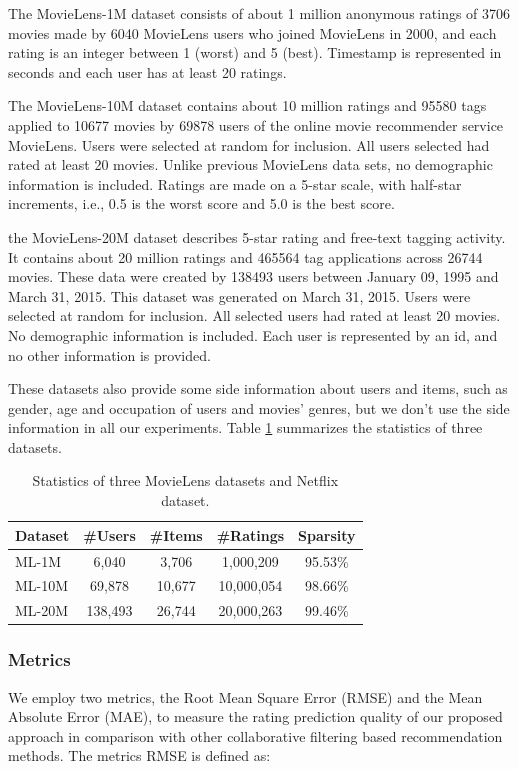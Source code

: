 \documentclass{sig-alternate-05-2015}
\begin{document}
The MovieLens-1M dataset consists of about 1 million anonymous ratings of 3706 movies
made by 6040 MovieLens users who joined MovieLens in 2000,
and each rating is an integer between 1 (worst) and 5 (best).
Timestamp is represented in seconds and each user has at least 20 ratings.

The MovieLens-10M dataset contains about 10 million ratings and 95580 tags
applied to 10677 movies by 69878 users of the online movie recommender service MovieLens.
Users were selected at random for inclusion. All users selected had rated
at least 20 movies. Unlike previous MovieLens data sets, no demographic information is included.
Ratings are made on a 5-star scale, with half-star increments, i.e., 0.5 is the worst score
and 5.0 is the best score.

the MovieLens-20M dataset describes 5-star rating and free-text tagging activity.
It contains about 20 million ratings and 465564 tag applications across 26744 movies.
These data were created by 138493 users between January 09, 1995 and March 31, 2015.
This dataset was generated on March 31, 2015.
Users were selected at random for inclusion. All selected users had rated
at least 20 movies. No demographic information is included.
Each user is represented by an id, and no other information is provided.

These datasets also provide some side information about users and items,
such as gender, age and occupation of users and movies' genres,
but we don't use the side information in all our experiments.
Table \ref{tab:statistics} summarizes the statistics of three datasets.

\begin{table}[htbp]
    \centering
    \caption{Statistics of three MovieLens datasets and Netflix dataset.}
    \label{tab:statistics}
    \begin{tabular}{|l|c|c|c|c|}
        \hline
        \textbf{Dataset} & \textbf{\#Users} & \textbf{\#Items} & \textbf{\#Ratings} & \textbf{Sparsity} \\
        \hline
        ML-1M  & 6,040    & 3,706  & 1,000,209   & 95.53\% \\
        ML-10M & 69,878   & 10,677 & 10,000,054  & 98.66\% \\
        ML-20M & 138,493  & 26,744 & 20,000,263  & 99.46\% \\
        \hline
    \end{tabular}
\end{table}

\subsubsection{Metrics}
We employ two metrics, the Root Mean Square Error (RMSE) and the Mean Absolute Error (MAE),
to measure the rating prediction quality of our proposed approach in comparison with other
collaborative filtering based recommendation methods.
The metrics RMSE is defined as:
\end{document}
